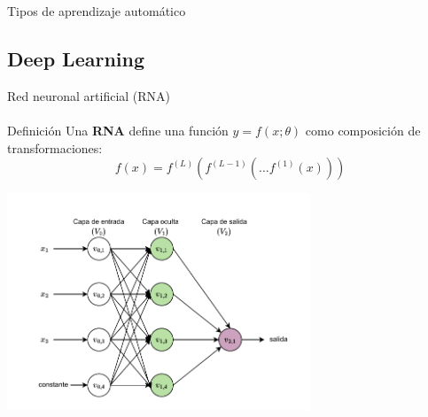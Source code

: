 \documentclass{beamer}
\begin{document}
\begin{frame}{Tipos de aprendizaje automático}
\begin{center}
\end{center}
\end{frame}




\subsection{Deep Learning}
\begin{frame}{Red neuronal artificial (RNA)}
\framesubtitle{\insertsubsectionhead}
\begin{block}{Definición}
Una \textbf{RNA} define una función $y = f(x; \theta)$ como composición de transformaciones:
\[
f(x) = f^{(L)}(f^{(L-1)}(\dots f^{(1)}(x)))
\]
\end{block}


\begin{center}
    \includegraphics[width=0.68\textwidth]{img/red_neuronal-colores.drawio.pdf}
\end{center}

\end{frame}
\end{document}
